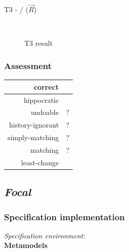 \documentclass{article}
\newcommand{\cmark}{\ding{51}}%
\begin{document}
T3 -  /  ($\overrightarrow{R}$)
\begin{figure}[ht]
    \centering
    \mbox{\quad\qquad\quad
          }
    \caption{T3 result}
    \label{fig:T3}
\end{figure}


\subsubsection{Assessment}

\begin{center}
\begin{tabular}{| r | c |}
  \hline                        
  correct & \cmark\\
  \hline
  hippocratic & \cmark\\
  \hline 
  undoable & ?\\
  \hline 
  history-ignorant & ?\\
  \hline 
  simply-matching & ?\\
  \hline 
  matching & ?\\
  \hline 
  least-change & \cmark\\
  \hline   
\end{tabular}
\end{center}

\pagebreak
\subsection{\textit{Focal}}
\subsubsection{Specification implementation}
\textit{Specification environment}:
~\\

\textbf{Metamodels}
~\\
\end{document}
